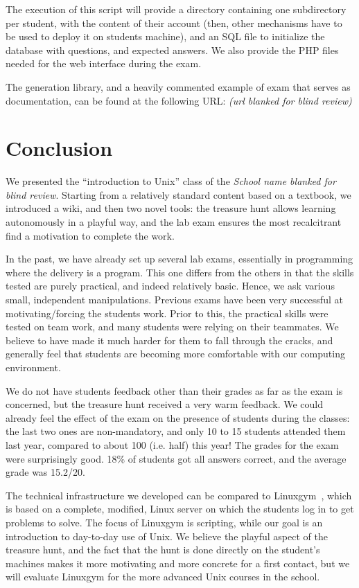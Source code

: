 \documentclass{sig-alternate}
\newcommand{\ensimag}[0]{\textit{School name blanked for blind review}}
\newcommand{\gitoriousproject}[0]{\textit{(url blanked for blind review)}}
\newcommand{\ensimag}[0]{Ensimag}
\newcommand{\gitoriousproject}[0]{\url{http://gitorious.org/unix-training}}
\begin{document}
The execution of this script will provide a directory containing one
subdirectory per student, with the content of their account (then,
other mechanisms have to be used to deploy it on students machine),
and an SQL file to initialize the database with questions, and
expected answers. We also provide the PHP files needed for the web
interface during the exam.

The generation library, and a heavily commented example of exam that
serves as documentation, can be found at the following URL:
\gitoriousproject

\section{Conclusion}
\label{sec=conclusion}

We presented the ``introduction to Unix'' class of the \ensimag{}.
Starting from a relatively standard content based on a textbook, we
introduced a wiki, and then two novel tools: the treasure hunt allows
learning autonomously in a playful way, and the lab exam
ensures the most recalcitrant find a motivation to complete the
work.

In the past, we have already set up several lab exams,
essentially in programming where the delivery is a program. This one
differs from the others in that the skills tested are purely
practical, and indeed relatively basic. Hence, we ask various small,
independent manipulations. Previous exams have
been very successful at motivating/forcing the students work.
Prior to this, the practical skills were tested on team work, and many
students were relying on their teammates. We believe to have made it
much harder for them to fall through the cracks, and generally feel
that students are becoming more comfortable with our computing
environment.

We do not have students feedback other than their grades as far as the
exam is concerned, but the treasure hunt received a very warm feedback.
We could already feel the effect of the exam on the presence of
students during the classes: the last two ones are non-mandatory, and
only 10 to 15 students attended them last year, compared to about 100
(i.e. half) this year! The grades for the exam were surprisingly good.
18\% of students got all answers correct, and the average grade was
15.2/20.

The technical infrastructure we developed can be compared to
Linuxgym~\cite{DBLP:conf/iticse/Solomon07}, which is based on a
complete, modified, Linux server on which the students log in to get
problems to solve. The focus of Linuxgym is scripting, while our goal
is an introduction to day-to-day use of Unix. We believe the playful
aspect of the treasure hunt, and the fact that the hunt is done
directly on the student's machines makes it more motivating and more
concrete for a first contact, but we will evaluate Linuxgym for the
more advanced Unix courses in the school.
\end{document}
